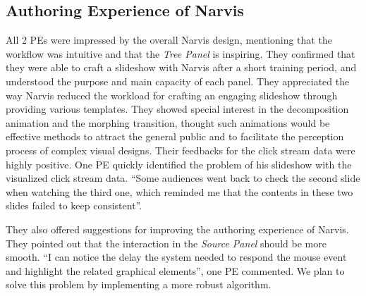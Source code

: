 \subsection{Authoring Experience of Narvis}
All 2 PEs were impressed by the overall Narvis design, mentioning that the workflow was intuitive and that the \textit{Tree Panel} is inspiring. They confirmed that they were able to craft a slideshow with Narvis after a short training period, and understood the purpose and main capacity of each panel. 
They appreciated the way Narvis reduced the workload for crafting an engaging slideshow through providing various templates. They showed special interest in the decomposition animation and the morphing transition, thought such animations would be effective methods to attract the general public and to facilitate the perception process of complex visual designs.  
Their feedbacks for the  click stream data were highly positive. One PE quickly identified the problem of his slideshow with the visualized click stream data. ``Some audiences went back to check the second slide when watching the third one, which reminded me that the contents in these two slides failed to keep consistent''.

They also offered suggestions for improving the authoring experience of Narvis. They pointed out that the interaction in the \textit{Source Panel} should be more smooth. ``I can notice the delay the system needed to respond the mouse event and highlight the related graphical elements'', one PE commented. We plan to solve this problem by implementing a more robust algorithm. 

